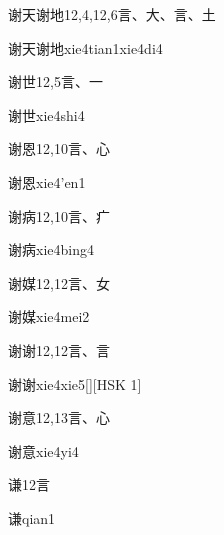 \begin{Entry}{谢天谢地}{12,4,12,6}{⾔、⼤、⾔、⼟}
  \begin{Phonetics}{谢天谢地}{xie4tian1xie4di4}
  \end{Phonetics}
\end{Entry}

\begin{Entry}{谢世}{12,5}{⾔、⼀}
  \begin{Phonetics}{谢世}{xie4shi4}
  \end{Phonetics}
\end{Entry}

\begin{Entry}{谢恩}{12,10}{⾔、⼼}
  \begin{Phonetics}{谢恩}{xie4'en1}
  \end{Phonetics}
\end{Entry}

\begin{Entry}{谢病}{12,10}{⾔、⽧}
  \begin{Phonetics}{谢病}{xie4bing4}
  \end{Phonetics}
\end{Entry}

\begin{Entry}{谢媒}{12,12}{⾔、⼥}
  \begin{Phonetics}{谢媒}{xie4mei2}
  \end{Phonetics}
\end{Entry}

\begin{Entry}{谢谢}{12,12}{⾔、⾔}
  \begin{Phonetics}{谢谢}{xie4xie5}[][HSK 1]
  \end{Phonetics}
\end{Entry}

\begin{Entry}{谢意}{12,13}{⾔、⼼}
  \begin{Phonetics}{谢意}{xie4yi4}
  \end{Phonetics}
\end{Entry}

\begin{Entry}{谦}{12}{⾔}
  \begin{Phonetics}{谦}{qian1}
  \end{Phonetics}
\end{Entry}

